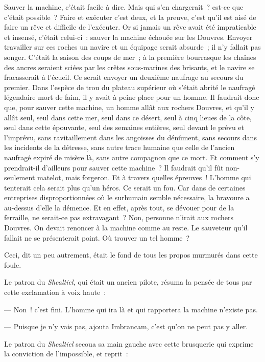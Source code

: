 \documentclass[french,twoside]{book} %
\begin{document}
Sauver la machine, c’était facile à dire. Mais qui s’en chargerait ? est-ce que c’était possible ? Faire et exécuter c’est deux, et la preuve, c’est qu’il est aisé de faire un rêve et difficile de l’exécuter. Or si jamais un rêve avait été impraticable et insensé, c’était celui-ci : sauver la machine échouée sur les Douvres. Envoyer travailler sur ces roches un navire et un équipage serait absurde ; il n’y fallait pas songer. C’était la saison des coups de mer ; à la première bourrasque les  chaînes des ancres seraient sciées par les crêtes sous-marines des brisants, et le navire se fracasserait à l’écueil. Ce serait envoyer un deuxième naufrage au secours du premier. Dans l’espèce de trou du plateau supérieur où s’était abrité le naufragé légendaire mort de faim, il y avait à peine place pour un homme. Il faudrait donc que, pour sauver cette machine, un homme allât aux rochers Douvres, et qu’il y allât seul, seul dans cette mer, seul dans ce désert, seul à cinq lieues de la côte, seul dans cette épouvante, seul des semaines entières, seul devant le prévu et l’imprévu, sans ravitaillement dans les angoisses du dénûment, sans secours dans les incidents de la détresse, sans autre trace humaine que celle de l’ancien naufragé expiré de misère là, sans autre compagnon que ce mort. Et comment s’y prendrait-il d’ailleurs pour sauver cette machine ? Il faudrait qu’il fût non-seulement matelot, mais forgeron. Et à travers quelles épreuves ! L’homme qui tenterait cela serait plus qu’un héros. Ce serait un fou. Car dans de certaines entreprises disproportionnées où le surhumain semble nécessaire, la bravoure a au-dessus d’elle la démence. Et en effet, après tout, se dévouer pour de la ferraille, ne serait-ce pas extravagant ? Non, personne n’irait aux rochers Douvres. On devait renoncer à la machine comme au reste. Le sauveteur qu’il fallait ne se présenterait point. Où trouver un tel homme ?\par
Ceci, dit un peu autrement, était le fond de tous les propos murmurés dans cette foule.\par
Le patron du \emph{Shealtiel,} qui était un ancien pilote,  résuma la pensée de tous par cette exclamation à voix haute :\par
— Non ! c’est fini. L’homme qui ira là et qui rapportera la machine n’existe pas.\par
— Puisque je n’y vais pas, ajouta Imbrancam, c’est qu’on ne peut pas y aller.\par
Le patron du \emph{Shealtiel} secoua sa main gauche avec cette brusquerie qui exprime la conviction de l’impossible, et reprit :\par
\end{document}
